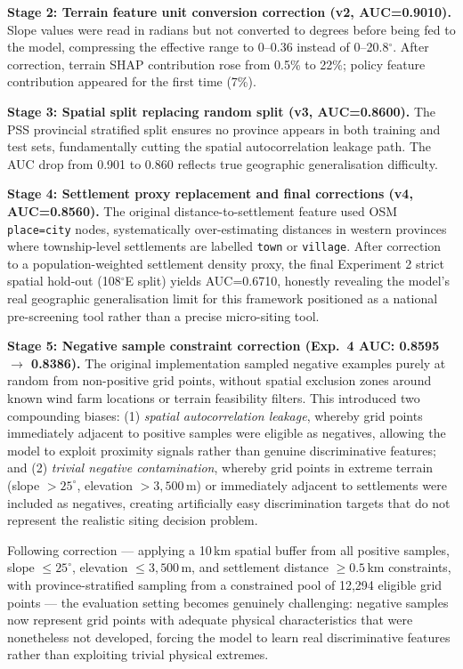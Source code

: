 \documentclass[12pt, a4paper]{article}
\begin{document}
\textbf{Stage 2: Terrain feature unit conversion correction
(v2, AUC=0.9010).} Slope values were read in radians but not
converted to degrees before being fed to the model, compressing
the effective range to 0--0.36 instead of 0--20.8$^\circ$.
After correction, terrain SHAP contribution rose from 0.5\%
to 22\%; policy feature contribution appeared for the first
time (7\%).

\textbf{Stage 3: Spatial split replacing random split
(v3, AUC=0.8600).} The PSS provincial stratified split ensures
no province appears in both training and test sets,
fundamentally cutting the spatial autocorrelation leakage
path. The AUC drop from 0.901 to 0.860 reflects true
geographic generalisation difficulty.

\textbf{Stage 4: Settlement proxy replacement and final
corrections (v4, AUC=0.8560).} The original
distance-to-settlement feature used OSM \texttt{place=city}
nodes, systematically over-estimating distances in western
provinces where township-level settlements are labelled
\texttt{town} or \texttt{village}. After correction to a
population-weighted settlement density proxy, the final
Experiment 2 strict spatial hold-out (108$^\circ$E split)
yields AUC=0.6710, honestly revealing the model's real
geographic generalisation limit for this framework positioned
as a national pre-screening tool rather than a precise
micro-siting tool.

\textbf{Stage 5: Negative sample constraint correction
(Exp.\ 4 AUC: 0.8595 $\rightarrow$ 0.8386).}
The original implementation sampled negative examples purely
at random from non-positive grid points, without spatial
exclusion zones around known wind farm locations or terrain
feasibility filters. This introduced two compounding biases:
(1) \textit{spatial autocorrelation leakage}, whereby grid
points immediately adjacent to positive samples were eligible
as negatives, allowing the model to exploit proximity signals
rather than genuine discriminative features; and (2)
\textit{trivial negative contamination}, whereby grid points
in extreme terrain (slope $> 25^\circ$, elevation $> 3{,}500$\,m)
or immediately adjacent to settlements were included as
negatives, creating artificially easy discrimination targets
that do not represent the realistic siting decision problem.

Following correction --- applying a 10\,km spatial buffer
from all positive samples, slope $\leq 25^\circ$, elevation
$\leq 3{,}500$\,m, and settlement distance $\geq 0.5$\,km
constraints, with province-stratified sampling from a
constrained pool of 12,294 eligible grid points --- the
evaluation setting becomes genuinely challenging: negative
samples now represent grid points with adequate physical
characteristics that were nonetheless not developed, forcing
the model to learn real discriminative features rather than
exploiting trivial physical extremes.
\end{document}
